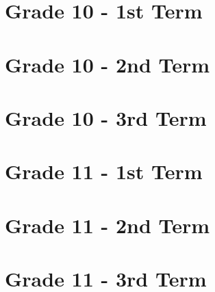 


\tableofcontents\label{table-of-contents}

\chapter{Grade 10 - 1st Term}

\chapter{Grade 10 - 2nd Term}

\chapter{Grade 10 - 3rd Term}

\chapter{Grade 11 - 1st Term}

\chapter{Grade 11 - 2nd Term}

\chapter{Grade 11 - 3rd Term}




